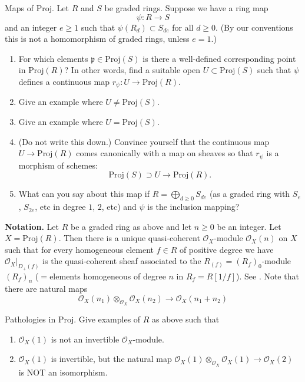 \begin{exercise}
\label{exercise-morphism-proj}
Maps of $\text{Proj}$. Let $R$ and $S$ be graded rings.
Suppose we have a ring map
$$
\psi : R \to S
$$
and an integer $e \geq 1$ such that $\psi(R_d) \subset S_{de}$
for all $d \geq 0$. (By our conventions this is not a homomorphism
of graded rings, unless $e = 1$.)
\begin{enumerate}
\item For which elements $\mathfrak p \in \text{Proj}(S)$ is
there a well-defined corresponding point in $\text{Proj}(R)$? In other words,
find a suitable open $U \subset \text{Proj}(S)$ such that $\psi$ defines
a continuous map $r_\psi : U \to \text{Proj}(R)$.
\item Give an example where $U \not = \text{Proj}(S)$.
\item Give an example where $U = \text{Proj}(S)$.
\item (Do not write this down.) Convince yourself that
the continuous map $U \to \text{Proj}(R)$ comes canonically with
a map on sheaves so that $r_\psi$ is a morphism of schemes:
$$
\text{Proj}(S) \supset U \longrightarrow \text{Proj}(R).
$$
\item What can you say about this map if
$R = \bigoplus_{d \geq 0} S_{de}$ (as a graded ring with
$S_e$, $S_{2e}$, etc in degree $1$, $2$, etc) and $\psi$
is the inclusion mapping?
\end{enumerate}
\end{exercise}

\noindent
{\bf Notation.} Let $R$ be a graded ring as above and
let $n \geq 0$ be an integer. Let $X = \text{Proj}(R)$. Then there is a unique
quasi-coherent ${\mathcal O}_X$-module ${\mathcal O}_X(n)$ on $X$ such that
for every homogeneous element $f \in R$ of positive degree we have
${\mathcal O}_X |_{D_{+}(f)}$ is the quasi-coherent sheaf associated to the
$R_{(f)} = (R_f)_0$-module $(R_f)_n$ ($ = $elements homogeneous of degree
$n$ in $R_f = R[1/f]$). See \cite[page 116+]{H}. Note that there are
natural maps
$$
{\mathcal O}_X(n_1) \otimes_{{\mathcal O}_X} {\mathcal O}_X(n_2)
\longrightarrow
{\mathcal O}_X(n_1 + n_2)
$$

\begin{exercise}
\label{exercise-pathologies-proj}
Pathologies in $\text{Proj}$.
Give examples of $R$ as above such that
\begin{enumerate}
\item ${\mathcal O}_X(1)$ is not an invertible ${\mathcal O}_X$-module.
\item ${\mathcal O}_X(1)$ is invertible, but the
natural map ${\mathcal O}_X(1) \otimes_{{\mathcal O}_X} {\mathcal O}_X(1) \to
{\mathcal O}_X(2)$ is NOT an isomorphism.
\end{enumerate}
\end{exercise}

